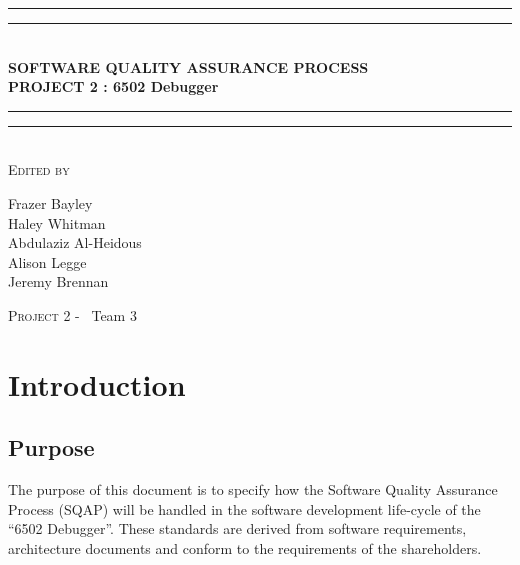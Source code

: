 \documentclass[a3paper, 11pt]{article}
\newlength{\drop}
\begin{document}
	
	\begin{titlepage}
		\textheight
		\centering\vspace*{\baselineskip}
		\rule{\textwidth}{1.6pt}\vspace*{-\baselineskip}\vspace*{2pt}
		\rule{\textwidth}{0.4pt}\\[\baselineskip]
		{\LARGE \textbf{SOFTWARE QUALITY ASSURANCE PROCESS \\ PROJECT 2 : 6502 Debugger}}\\[0.2\baselineskip]
		\rule{\textwidth}{0.4pt}\vspace*{-\baselineskip}\vspace{3.2pt}
		\rule{\textwidth}{1.6pt}\\[\baselineskip]
		\scshape
		\vspace*{2\baselineskip}
		Edited by \\[\baselineskip]
		{\Large Frazer Bayley \\ Haley Whitman \\ Abdulaziz Al-Heidous \\ Alison Legge \\ Jeremy Brennan\par}
		
		\vfill
		{\scshape \LARGE Project 2 -} \        {\LARGE Team 3}\par	
	\end{titlepage}

\tableofcontents

\vspace*{10\baselineskip}
\begin{versionhistory}
\end{versionhistory}
\pagebreak	


\section{Introduction}
\subsection{Purpose}
The purpose of this document is to specify how the Software Quality Assurance Process (SQAP) will be handled in the software development life-cycle of the “6502 Debugger”. These standards are derived from software requirements, architecture documents and conform to the requirements of the shareholders. 
\end{document}
